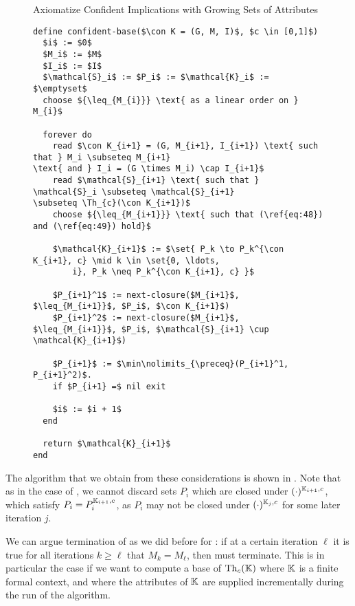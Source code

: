 \begin{figure}[tp]
  \begin{Algorithm} Axiomatize Confident Implications with Growing Sets of Attributes
    \hspace*{0cm}
    \label{alg:confident-base/growing-attributes}
    \begin{lstlisting}
define confident-base($\con K = (G, M, I)$, $c \in [0,1]$)
  $i$ := $0$
  $M_i$ := $M$
  $I_i$ := $I$
  $\mathcal{S}_i$ := $P_i$ := $\mathcal{K}_i$ := $\emptyset$
  choose ${\leq_{M_{i}}} \text{ as a linear order on } M_{i}$
  
  forever do
    read $\con K_{i+1} = (G, M_{i+1}, I_{i+1}) \text{ such that } M_i \subseteq M_{i+1}
\text{ and } I_i = (G \times M_i) \cap I_{i+1}$
    read $\mathcal{S}_{i+1} \text{ such that } \mathcal{S}_i \subseteq \mathcal{S}_{i+1}
\subseteq \Th_{c}(\con K_{i+1})$
    choose ${\leq_{M_{i+1}}} \text{ such that (\ref{eq:48}) and (\ref{eq:49}) hold}$

    $\mathcal{K}_{i+1}$ := $\set{ P_k \to P_k^{\con K_{i+1}, c} \mid k \in \set{0, \ldots,
        i}, P_k \neq P_k^{\con K_{i+1}, c} }$

    $P_{i+1}^1$ := next-closure($M_{i+1}$, $\leq_{M_{i+1}}$, $P_i$, $\con K_{i+1}$)
    $P_{i+1}^2$ := next-closure($M_{i+1}$, $\leq_{M_{i+1}}$, $P_i$, $\mathcal{S}_{i+1} \cup \mathcal{K}_{i+1}$)

    $P_{i+1}$ := $\min\nolimits_{\preceq}(P_{i+1}^1, P_{i+1}^2)$.
    if $P_{i+1} =$ nil exit

    $i$ := $i + 1$
  end

  return $\mathcal{K}_{i+1}$  
end
    \end{lstlisting}
  \end{Algorithm}
\end{figure}

The algorithm that we obtain from these considerations is shown in
.  Note that as in the case of
, we cannot discard sets $P_{i}$ which are closed
under $(\cdot)^{{\mathbb{K}}_{i+1}, c}$, \ie which satisfy $P_{i} = P_{i}^{{\mathbb{K}}_{i+1}, c}$, as
$P_{i}$ may not be closed under $(\cdot)^{{\mathbb{K}}_{j}, c}$ for some later iteration $j$.

We can argue termination of  as we did before
for : if at a certain iteration $\ell$ it is true
for all iterations $k \geq \ell$ that $M_{k} = M_{\ell}$, then
 must terminate.  This is in particular the
case if we want to compute a base of $\operatorname{Th}_{c}({\mathbb{K}})$ where ${\mathbb{K}}$ is a finite formal
context, and where the attributes of ${\mathbb{K}}$ are supplied incrementally during the run of
the algorithm.

